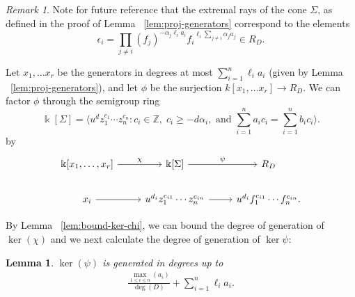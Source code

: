 \documentclass{amsart}
\theoremstyle{plain}
\newtheorem{lem}[thm]{Lemma}
\theoremstyle{definition}
\theoremstyle{remark}
\newtheorem{rem}[thm]{Remark}
\numberwithin{equation}{section}
\newcommand\bk{{\Bbbk}}
\newcommand\bida{a}
\newcommand\bidb{b}
\begin{document}
\begin{rem}
\label{rem:pm-extremal-rays}
Note for future reference that the extremal rays of the cone $\Sigma$, as defined in the proof of Lemma ~\ref{lem:proj-generators} correspond to the elements
\begin{equation}
\label{eqn:epsilon-def-proj}
	\epsilon_i = \prod_{j\ne i} (f_j)^{-\alpha_j \ell_i a_i} {f_i}^{\ell_i \sum_{j\ne i} \alpha_j a_j}\in R_D.
\end{equation}
\end{rem}



Let $x_1, \ldots x_r$ be the generators in degrees at most $\sum_{i=1}^n \ell_i \bida_i$ (given by Lemma ~\ref{lem:proj-generators}), and let $\phi$ be the surjection $k[x_1, \ldots x_r] \to R_D$.  We can factor $\phi$ through the semigroup ring 
\[
	\bk[\Sigma] =  \langle u^d z_1^{c_1} \cdots z_n^{c_n} : c_i \in \mathbb{Z}, \; c_i \geq -d \alpha_i, \mbox{ and }\sum_{i=1}^{n} \bida_i c_i = \sum_{i=1}^{n} \bidb_i c_i \rangle. 
\]
by
\[
\begin{tikzcd}
\bk[x_1,\ldots, x_r] \ar {r}{\chi} & \bk[\Sigma] \ar {r}{\psi} & R_D \\
x_i \ar r & u^{d_i}z_1^{c_{i1}} \cdots z_n^{c_{in}} \ar r & u^{d_i}f_1^{c_{i1}} \cdots f_n^{c_{in}}.
\end{tikzcd}
\]

By Lemma ~\ref{lem:bound-ker-chi}, we can bound the degree of generation of $\ker(\chi)$ and we next calculate the degree of generation of $\ker \psi$:

\begin{lem}
\label{lem:proj-relations-psi}
$\ker(\psi)$ is generated in degrees up to
\begin{align}
\label{eqn:pm-relation-degree}
	\frac{\max_{1\le i \le n}(\bida_i)}{\deg(D)} +  \sum_{i=1}^n \ell_i a_i.
\end{align}

\end{lem}
\end{document}

